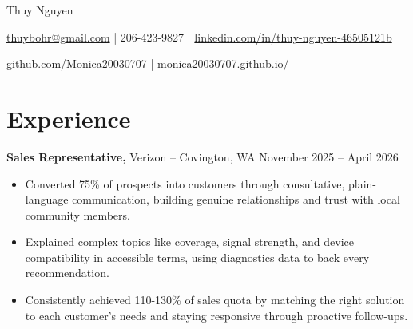\documentclass[11pt]{article}       %
\begin{document}
\centerline{\Huge Thuy Nguyen}

\vspace{5pt}

\centerline{\href{mailto:thuybohr@gmail.com}{thuybohr@gmail.com} | 206-423-9827 |
\href{https://www.linkedin.com/in/thuy-nguyen-46505121b/}{linkedin.com/in/thuy-nguyen-46505121b}}

\centerline{\href{https://github.com/Monica20030707}{github.com/Monica20030707} | 
\href{https://monica20030707.github.io/}{monica20030707.github.io/}} 

\vspace{-9pt}

\section*{Experience}

\textbf{Sales Representative,} {Verizon} -- Covington, WA \hfill November 2025 -- April 2026 \\
\vspace{-9pt}
\begin{itemize}
  \item Converted 75\% of prospects into customers through consultative, plain-language communication, building genuine relationships and trust with local community members.
  \item Explained complex topics like coverage, signal strength, and device compatibility in accessible terms, using diagnostics data to back every recommendation.
  \item Consistently achieved 110-130\% of sales quota by matching the right solution to each customer's needs and staying responsive through proactive follow-ups.
\end{itemize}

\end{document}
